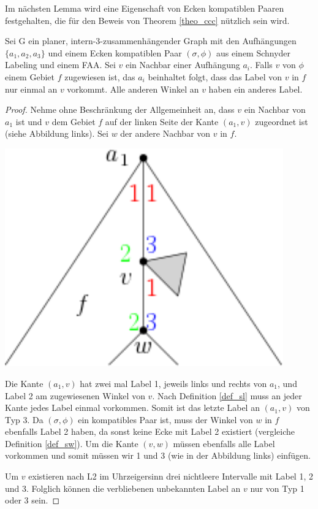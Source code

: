Im nächsten Lemma wird eine Eigenschaft von Ecken kompatiblen Paaren festgehalten, die für den Beweis von Theorem \ref{theo_ccc} nützlich sein wird.

\begin{lemma}\label{lem4}
Sei G ein planer, intern-3-zusammenhängender Graph mit den Aufhängungen $\{a_1,a_2,a_3\}$ und einem Ecken kompatiblen Paar $(\sigma,\phi)$ aus einem Schnyder Labeling und einem FAA. Sei $v$ ein Nachbar einer Aufhängung $a_i$. Falls $v$ von $\phi$ einem Gebiet $f$ zugewiesen ist, das $a_i$ beinhaltet folgt, dass das Label von $v$ in $f$ nur einmal an $v$ vorkommt. Alle anderen Winkel an $v$ haben ein anderes Label.
\end{lemma}

\begin{proof}
Nehme ohne Beschränkung der Allgemeinheit an, dass $v$ ein Nachbar von $a_1$ ist und $v$ dem Gebiet $f$ auf der linken Seite der Kante $(a_1,v)$ zugeordnet ist (siehe Abbildung links). Sei $w$ der andere Nachbar von $v$ in $f$. 

\begin{minipage}{0.4\textwidth}
\begin{center}
    \includegraphics[width=0.9\textwidth]{lem4.png}
  \end{center}
\end{minipage}
\begin{minipage}{0.568\textwidth}
\vspace{1mm}
Die Kante $(a_1,v)$ hat zwei mal Label 1, jeweils links und rechts von $a_1$, und Label 2 am zugewiesenen Winkel von $v$. Nach Definition \ref{def_sl} muss an jeder Kante jedes Label einmal vorkommen. Somit ist das letzte Label an $(a_1,v)$ von Typ 3. Da $(\sigma,\phi)$ ein kompatibles Paar ist, muss der Winkel von $w$ in $f$ ebenfalls Label 2 haben, da sonst keine Ecke mit Label 2 existiert (vergleiche Definition \ref{def_sw}). Um die Kante $(v,w)$ müssen ebenfalls alle Label vorkommen und somit müssen wir 1 und 3 (wie in der Abbildung links) einfügen. 
\vspace{1mm}
\end{minipage}

Um $v$ existieren nach L2 im Uhrzeigersinn drei nichtleere Intervalle mit Label 1, 2 und 3. Folglich können die verbliebenen unbekannten Label an $v$ nur von Typ 1 oder 3 sein.
\end{proof}

